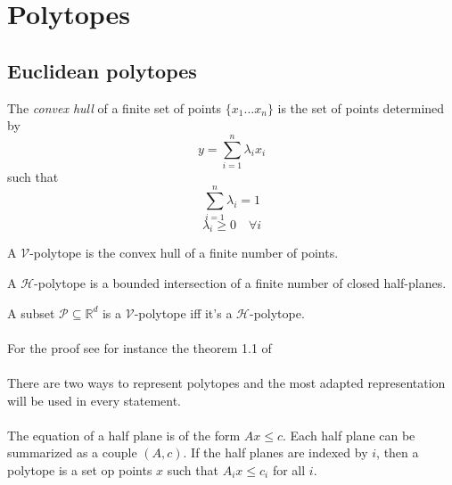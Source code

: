 \section{Polytopes}

\subsection{Euclidean polytopes}
\begin{definition}
  The \textit{convex hull} of a finite set of points $\{x_1 \dots x_n\}$ is the set of points determined by
  \[
    y = \sum_{i=1}^n \lambda_i x_i
  \]
  such that
  \[
    \sum_{i=1}^n \lambda_i = 1
  \]
  \[
    \lambda_i \ge 0 \quad \forall i
  \]
\end{definition}

\begin{definition}
  A $\mathcal V$-polytope is the convex hull of a finite number of points.
\end{definition}

\begin{definition}
  A $\mathcal H$-polytope is a bounded intersection of a finite number of closed half-planes.
\end{definition}

\begin{theorem}
  A subset $\mathcal P \subseteq \mathbb R^d$ is a $\mathcal V$-polytope iff it's a $\mathcal H$-polytope.
\end{theorem}

\paragraph{}
For the proof see for instance the theorem 1.1 of~\cite{polytopes}

\paragraph{}
There are two ways to represent polytopes and the most adapted representation will be used in every statement.

\paragraph{}
The equation of a half plane is of the form $Ax \le c$. Each half plane can be summarized as a couple $(A,c)$. If the half planes are indexed by $i$, then a polytope is a set op points $x$ such that $A_i x \le c_i$ for all $i$.


